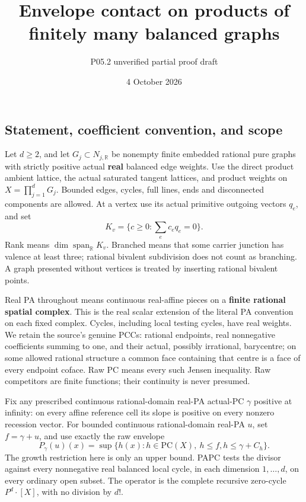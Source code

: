 \documentclass[
  11pt,
]{article}
\title{Envelope contact on products of finitely many balanced graphs}
\author{P05.2 unverified partial proof draft}
\date{4 October 2026}
\begin{document}
\maketitle

\subsection{Statement, coefficient convention, and
scope}\label{statement-coefficient-convention-and-scope}

Let \(d\geq2\), and let \(G_j\subset N_{j,\mathbb{R}}\) be nonempty
finite embedded rational pure graphs with strictly positive actual
\textbf{real} balanced edge weights. Use the direct product ambient
lattice, the actual saturated tangent lattices, and product weights on
\(X=\prod_{j=1}^dG_j\). Bounded edges, cycles, full lines, ends and
disconnected components are allowed. At a vertex use its actual
primitive outgoing vectors \(q_e\), and set \[
 K_v=\{c\geq0:\sum_e c_eq_e=0\}.
\] Rank means \(\dim\operatorname{span}_{\mathbb{R}}K_v\). Branched
means that some carrier junction has valence at least three; rational
bivalent subdivision does not count as branching. A graph presented
without vertices is treated by inserting rational bivalent points.

Real PA throughout means continuous real-affine pieces on a
\textbf{finite rational spatial complex}. This is the real scalar
extension of the literal PA convention on each fixed complex. Cycles,
including local testing cycles, have real weights. We retain the
source's genuine PCCs: rational endpoints, real nonnegative coefficients
summing to one, and their actual, possibly irrational, barycentre; on
some allowed rational structure a common face containing that centre is
a face of every endpoint coface. Raw PC means every such Jensen
inequality. Raw competitors are finite functions; their continuity is
never presumed.

Fix any prescribed continuous rational-domain real-PA actual-PC
\(\gamma\) positive at infinity: on every affine reference cell its
slope is positive on every nonzero recession vector. For bounded
continuous rational-domain real-PA \(u\), set \(f=\gamma+u\), and use
exactly the raw envelope \[
 P_\gamma(u)(x)=\sup\{h(x):h\in\mathrm{PC}(X),\ h\leq f,
                                      h\leq\gamma+C_h\}.
 \tag{E}
\] The growth restriction here is only an upper bound. PAPC tests the
divisor against every nonnegative real balanced local cycle, in each
dimension \(1,\ldots,d\), on every ordinary open subset. The operator is
the complete recursive zero-cycle \(P^d\cdot[X]\), with no division by
\(d!\).
\end{document}
